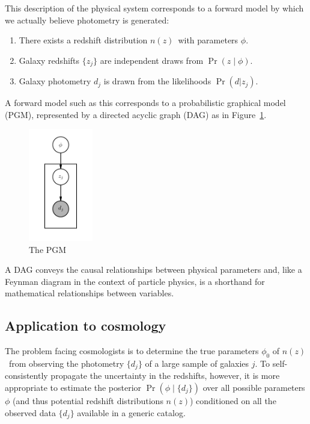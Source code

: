 \documentclass[iop]{emulateapj}
\newcommand{\nz}{$n(z)$}
\begin{document}
This description of the physical system corresponds to a forward model by which we actually believe photometry is generated:
\begin{enumerate}
	\item There exists a redshift distribution \nz\ with parameters $\phi$.
	\item Galaxy redshifts $\{z_{j}\}$ are independent draws from $\Pr(z 
\mid \phi)$.
	\item Galaxy photometry $d_{j}$ is drawn from the likelihoods $\Pr(d | 
z_{j})$.
\end{enumerate}
A forward model such as this corresponds to a probabilistic graphical model (PGM), represented by a directed acyclic graph (DAG) as in Figure~\ref{fig:pgm}.
\begin{figure}
	\begin{center}
		\includegraphics[width=0.25\textwidth]{fig/pgm.png}
		\caption{The PGM}
		\label{fig:pgm}
	\end{center}
\end{figure}
A DAG conveys the causal relationships between physical parameters and, like a Feynman diagram in the context of particle physics, is a shorthand for mathematical relationships between variables.

\subsection{Application to cosmology}
\label{sec:application}

The problem facing cosmologists is to determine the true parameters $\phi_{0}$ of \nz\ from observing the photometry $\{d_{j}\}$ of a large sample of galaxies $j$.
To self-consistently propagate the uncertainty in the redshifts, however, it is more appropriate to estimate the posterior $\Pr(\phi \mid \{d_{j}\})$ over all possible parameters $\phi$ (and thus potential redshift distributions \nz ) conditioned on all the observed data $\{d_{j}\}$ available in a generic catalog.
\end{document}

